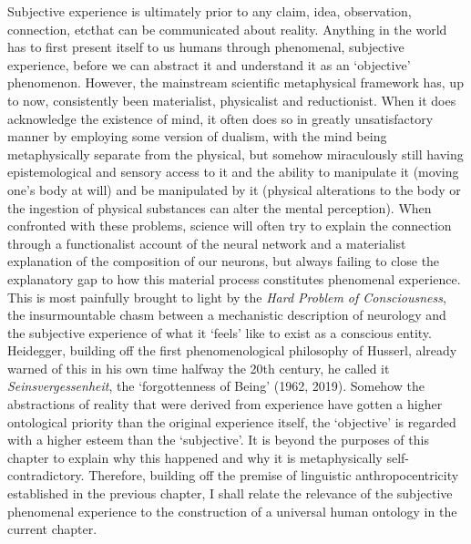 Subjective experience is ultimately prior to any claim, idea, observation, connection, etc\. that can be communicated about reality. Anything in the world has to first present itself to us humans through phenomenal, subjective experience, before we can abstract it and understand it as an ‘objective’ phenomenon. However, the mainstream scientific metaphysical framework has, up to now, consistently been materialist, physicalist and reductionist. When it does acknowledge the existence of mind, it often does so in greatly unsatisfactory manner by employing some version of dualism, with the mind being metaphysically separate from the physical, but somehow miraculously still having epistemological and sensory access to it and the ability to manipulate it (moving one’s body at will) and be manipulated by it (physical alterations to the body or the ingestion of physical substances can alter the mental perception). When confronted with these problems, science will often try to explain the connection through a functionalist account of the neural network and a materialist explanation of the composition of our neurons, but always failing to close the explanatory gap to how this material process constitutes phenomenal experience. This is most painfully brought to light by the {\it Hard Problem of Consciousness}, the insurmountable chasm between a mechanistic description of neurology and the subjective experience of what it ‘feels’ like to exist as a conscious entity. Heidegger, building off the first phenomenological philosophy of Husserl, already warned of this in his own time halfway the 20th century, he called it \textit{Seinsvergessenheit}, the ‘forgottenness of Being’ (1962, 2019). Somehow the abstractions of reality that were derived from experience have gotten a higher ontological priority than the original experience itself, the ‘objective’ is regarded with a higher esteem than the ‘subjective’. It is beyond the purposes of this chapter to explain why this happened and why it is metaphysically self-contradictory. Therefore, building off the premise of linguistic anthropocentricity established in the previous chapter, I shall relate the relevance of the subjective phenomenal experience to the construction of a universal human ontology in the current chapter. 

